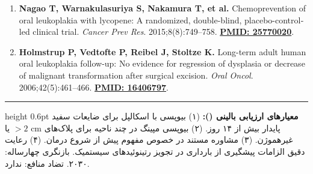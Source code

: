 \documentclass[a4paper]{article}
\begin{document}
\begin{latin}
\begin{enumerate}
    \item \textbf{Nagao T, Warnakulasuriya S, Nakamura T, et al.} Chemoprevention of oral leukoplakia with lycopene: A randomized, double-blind, placebo-controlled clinical trial. \textit{Cancer Prev Res}. 2015;8(8):749--758. \href{https://pubmed.ncbi.nlm.nih.gov/25770020/}{\textbf{PMID: 25770020}}.
    \item \textbf{Holmstrup P, Vedtofte P, Reibel J, Stoltze K.} Long-term adult human oral leukoplakia follow-up: No evidence for regression of dysplasia or decrease of malignant transformation after surgical excision. \textit{Oral Oncol}. 2006;42(5):461--466. \href{https://pubmed.ncbi.nlm.nih.gov/16406797/}{\textbf{PMID: 16406797}}.
\end{enumerate}
\end{latin}

\vspace{5pt}
\hrule height 0.6pt\vspace{3pt}
\footnotesize\textbf{معیارهای ارزیابی بالینی ():} (۱) بیوپسی با اسکالپل برای ضایعات سفید پایدار بیش از ۱۴ روز. (۲) بیوپسی مپینگ در چند ناحیه برای پلاک‌های $>2\text{ cm}$ یا غیرهموژن. (۳) مشاوره مستند در خصوص مفهوم  پیش از شروع درمان. (۴) رعایت دقیق الزامات پیشگیری از بارداری در تجویز رتینوئیدهای سیستمیک. بازنگری چهارساله: ۲۰۳۰. تضاد منافع: ندارد.
\end{document}
